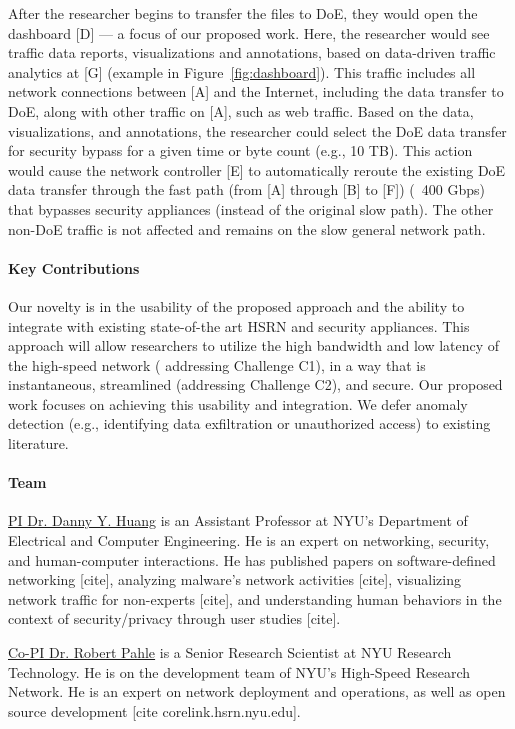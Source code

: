 After the researcher begins to transfer the files to DoE, they would open the dashboard [D] — a focus of our proposed work. Here, the researcher would see traffic data reports, visualizations and annotations, based on data-driven traffic analytics at [G] (example in Figure~\ref{fig:dashboard}). This traffic includes all network connections between [A] and the Internet, including the data transfer to DoE, along with other traffic on [A], such as web traffic. Based on the data, visualizations, and annotations, the researcher could select the DoE data transfer for security bypass for a given time or byte count (e.g., 10 TB). This action would cause the network controller [E] to automatically reroute  the existing DoE data transfer through the fast path (from [A] through [B] to [F]) (~400 Gbps) that bypasses security appliances (instead of the original slow path). The other non-DoE traffic is not affected and remains on the slow general network path.

\paragraph{Key Contributions}
Our novelty is in the usability of the proposed approach and the ability to integrate with existing state-of-the art HSRN and security appliances. This approach will allow researchers to utilize the high bandwidth and low latency of the high-speed network ( addressing Challenge C1), in a way that is instantaneous, streamlined (addressing Challenge C2), and secure. Our proposed work focuses on achieving this usability and integration. We defer anomaly detection (e.g., identifying data exfiltration or unauthorized access) to existing literature.

\paragraph{Team}
\underline{PI Dr. Danny Y. Huang} is an Assistant Professor at NYU's Department of Electrical and Computer Engineering. He is an expert on networking, security, and human-computer interactions. He has published papers on software-defined networking [cite], analyzing malware's network activities [cite], visualizing network traffic for non-experts [cite], and understanding human behaviors in the context of security/privacy through user studies [cite].

\underline{Co-PI Dr. Robert Pahle} is a Senior Research Scientist at NYU Research Technology. He is on the development team of NYU's High-Speed Research Network. He is an expert on network deployment and operations, as well as open source development [cite corelink.hsrn.nyu.edu].


